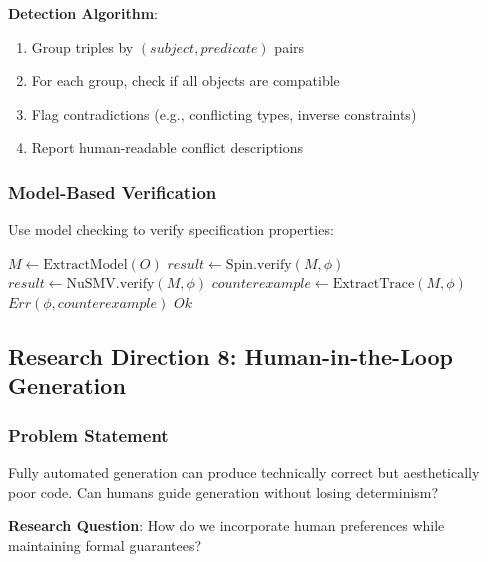 \textbf{Detection Algorithm}:
\begin{enumerate}
    \item Group triples by $(subject, predicate)$ pairs
    \item For each group, check if all objects are compatible
    \item Flag contradictions (e.g., conflicting types, inverse constraints)
    \item Report human-readable conflict descriptions
\end{enumerate}

\subsubsection{Model-Based Verification}

Use model checking to verify specification properties:

\begin{algorithm}
\caption{Model Checking Specifications}
\begin{algorithmic}[1]
    \State $M \gets \text{ExtractModel}(O)$ 
         
            \State $result \gets \text{Spin.verify}(M, \phi)$
         
            \State $result \gets \text{NuSMV.verify}(M, \phi)$
        \EndIf
            \State $counterexample \gets \text{ExtractTrace}(M, \phi)$
            \State \Return $Err(\phi, counterexample)$
        \EndIf
    \EndFor
    \State \Return $Ok$
\EndProcedure
\end{algorithmic}
\end{algorithm}

\subsection{Research Direction 8: Human-in-the-Loop Generation}

\subsubsection{Problem Statement}

Fully automated generation can produce technically correct but aesthetically poor code. Can humans guide generation without losing determinism?

\textbf{Research Question}: How do we incorporate human preferences while maintaining formal guarantees?

